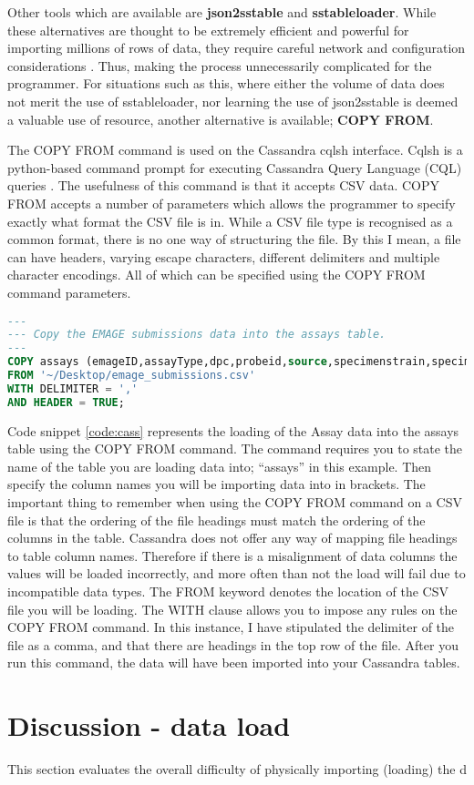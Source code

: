 Other tools which are available are \textbf{json2sstable} and \textbf{sstableloader}. While these alternatives are thought to be extremely efficient and powerful for importing millions of rows of data, they require careful network and configuration considerations \cite{cass}. Thus, making the process unnecessarily complicated for the programmer. For situations such as this, where either the volume of data does not merit the use of sstableloader, nor learning the use of json2sstable is deemed a valuable use of resource, another alternative is available; \textbf{COPY FROM}.

The COPY FROM command is used on the Cassandra cqlsh interface. Cqlsh is a python-based command prompt for executing Cassandra Query Language (CQL) queries \cite{ds}. The usefulness of this command is that it accepts CSV data. COPY FROM accepts a number of parameters which allows the programmer to specify exactly what format the CSV file is in. While a CSV file type is recognised as a common format, there is no one way of structuring the file. By this I mean, a file can have headers, varying escape characters, different delimiters and multiple character encodings. All of which can be specified using the COPY FROM command parameters.

\begin{lstlisting}[language=SQL, caption=Loading data into Apache Cassandra using the cqlsh interface., label=code:cass]
---
--- Copy the EMAGE submissions data into the assays table.
---
COPY assays (emageID,assayType,dpc,probeid,source,specimenstrain,specimentype,theilerstage)
FROM '~/Desktop/emage_submissions.csv'
WITH DELIMITER = ','
AND HEADER = TRUE;
\end{lstlisting}

Code snippet \ref{code:cass} represents the loading of the Assay data into the assays table using the COPY FROM command. The command requires you to state the name of the table you are loading data into; ``assays'' in this example. Then specify the column names you will be importing data into in brackets.  The important thing to remember when using the COPY FROM command on a CSV file is that the ordering of the file headings must match the ordering of the columns in the table. Cassandra does not offer any way of mapping file headings to table column names. Therefore if there is a misalignment of data columns the values will be loaded incorrectly, and more often than not the load will fail due to incompatible data types. The FROM keyword denotes the location of the CSV file you will be loading. The WITH clause allows you to impose any rules on the COPY FROM command. In this instance, I have stipulated the delimiter of the file as a comma, and that there are headings in the top row of the file. After you run this command, the data will have been imported into your Cassandra tables.

\section{Discussion - data load}\label{loaddiscussion}
This section evaluates the overall difficulty of physically importing (loading) the d







